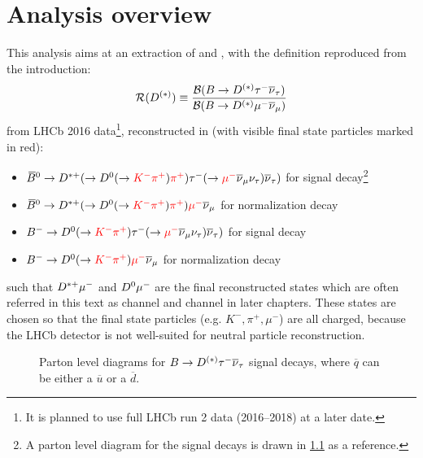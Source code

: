 \chapter{Analysis overview}
\label{ref:overview}

This analysis aims at an extraction of \RD and \RDst,
with the definition reproduced from the introduction:
\begin{equation}
    \mathcal{R}(D^{(*)}) \equiv \frac{\mathcal{B}(B \rightarrow D^{(*)} {\tau^-} {{\overline{\nu}}_\tau})}{\mathcal{B}(B \rightarrow D^{(*)} {\mu^-} {{\overline{\nu}}_\mu})}
\end{equation}
from LHCb 2016 data\footnote{
    It is planned to use full LHCb run 2 data (2016--2018) at a later date.
}, reconstructed in (with visible final state particles marked in red):
\begin{itemize}
    \item ${{\kern 0.18em\overline{\kern -0.18em B}}{}^0} \rightarrow {\ensuremath{{D}^{*+}}} (\rightarrow {\ensuremath{{D}^0}} (\rightarrow \textcolor{red}{{{K}^-} {{\pi}^+}})\textcolor{red}{{{\pi}^+}}) {\tau^-} (\rightarrow \textcolor{red}{{\mu^-}} {{\overline{\nu}}_\mu} {{\nu}_\tau}) {{\overline{\nu}}_\tau})$
        for \RDst signal decay\footnote{
            A parton level diagram for the signal decays is drawn in
            \cref{fig:decay-diagrams} as a reference.
        }
    \item ${{\kern 0.18em\overline{\kern -0.18em B}}{}^0} \rightarrow {\ensuremath{{D}^{*+}}} (\rightarrow {\ensuremath{{D}^0}} (\rightarrow \textcolor{red}{{{K}^-} {{\pi}^+}})\textcolor{red}{{{\pi}^+}}) \textcolor{red}{{\mu^-}} {{\overline{\nu}}_\mu}$
        for \RDst normalization decay
    \item ${{{B}^-}} \rightarrow {\ensuremath{{D}^0}} (\rightarrow \textcolor{red}{{{K}^-} {{\pi}^+}}) {\tau^-} (\rightarrow \textcolor{red}{{\mu^-}} {{\overline{\nu}}_\mu} {{\nu}_\tau}) {{\overline{\nu}}_\tau})$
        for \RD signal decay
    \item ${{{B}^-}} \rightarrow {\ensuremath{{D}^0}} (\rightarrow \textcolor{red}{{{K}^-} {{\pi}^+}}) \textcolor{red}{{\mu^-}} {{\overline{\nu}}_\mu}$
        for \RD normalization decay
\end{itemize}
such that ${{D}^{*+}}{\mu^-}$ and ${{D}^0}{\mu^-}$ are the final reconstructed states
which are often referred in this text as \Dstar channel and \Dz channel in later
chapters.
These states are chosen so that the final state particles
(e.g. $K^-, \pi^+, \mu^-$) are all charged,
because the LHCb detector is not well-suited for neutral particle
reconstruction.

\begin{figure}[!htb]
    \centering
    \resizebox{0.8\textwidth}{!}{
        
    }

    \caption{
        Parton level diagrams for $B \rightarrow D^{(*)} {\tau^-}{{\overline{\nu}}_\tau}$ signal
        decays,
        where $\overline q$ can be either a $\overline u$ or a $\overline d$.
    }
    \label{fig:decay-diagrams}
\end{figure}

